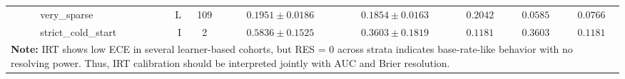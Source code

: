 \begin{table}[H]
{\begin{tabular}{lllrcccccc}
 &  & very\_sparse & L & 109 & $0.1951 \pm 0.0186$ & $0.1854 \pm 0.0163$ & $0.2042$ & $0.0585$ & $0.0766$ \\
 &  & strict\_cold\_start & I & 2 & $0.5836 \pm 0.1525$ & $0.3603 \pm 0.1819$ & $0.1181$ & $0.3603$ & $0.1181$ \\
\bottomrule
\multicolumn{10}{p{17.5cm}}{\scriptsize \textbf{Note:} IRT shows low ECE in several learner-based cohorts, but RES = 0 across strata indicates base-rate-like behavior with no resolving power. Thus, IRT calibration should be interpreted jointly with AUC and Brier resolution.} \\
\end{tabular}%
}
\end{table}

